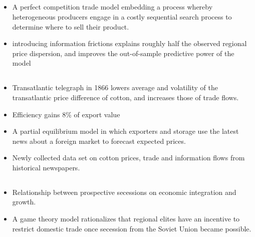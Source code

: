 \documentclass[10pt]{article} %
\begin{document}
    \subsection{\cite{AtkesonBurstein2008}}

    \subsection{\cite{Allen2014}}
    \begin{itemize}
        \item A perfect competition trade model embedding a process whereby heterogeneous producers engage in a costly sequential search process to determine where to sell their product.
        \item introducing information frictions explains roughly half the observed regional price dispersion, and improves the out-of-sample predictive power of the model
    \end{itemize}

    \subsection{\cite{Steinwender2018}}
    \begin{itemize}
        \item Transatlantic telegraph in 1866 lowers average and volatility of the transatlantic price difference of cotton, and increases those of trade flows. 
        \item Efficiency gains 8\% of export value
        \item A partial equilibrium model in which exporters and storage use the latest news about a foreign market to forecast expected prices.
        \item Newly collected data set on cotton prices, trade and information flows from historical newspapers.
    \end{itemize}

    \subsection{\cite{Suesse2018}}
    \begin{itemize}
        \item Relationship between prospective secessions on economic integration and growth.
        \item A game theory model rationalizes that regional elites have an incentive to restrict domestic trade once secession from the Soviet Union became possible.
    \end{itemize}
\end{document}
